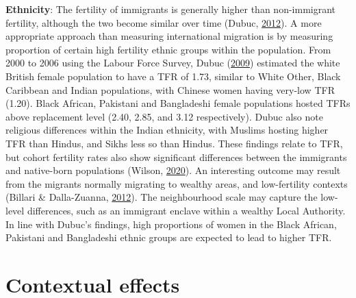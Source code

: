 \documentclass[12pt,twoside]{reedthesis}
\begin{document}
\textbf{Ethnicity}: The fertility of immigrants is generally higher than non-immigrant fertility, although the two become similar over time (Dubuc, \protect\hyperlink{ref-dubuc2012}{2012}). A more appropriate approach than measuring international migration is by measuring proportion of certain high fertility ethnic groups within the population. From 2000 to 2006 using the Labour Force Survey, Dubuc (\protect\hyperlink{ref-dubuc2009}{2009}) estimated the white British female population to have a TFR of 1.73, similar to White Other, Black Caribbean and Indian populations, with Chinese women having very-low TFR (1.20). Black African, Pakistani and Bangladeshi female populations hosted TFRs above replacement level (2.40, 2.85, and 3.12 respectively). Dubuc also note religious differences within the Indian ethnicity, with Muslims hosting higher TFR than Hindus, and Sikhs less so than Hindus. These findings relate to TFR, but cohort fertility rates also show significant differences between the immigrants and native-born populations (Wilson, \protect\hyperlink{ref-wilson2020}{2020}). An interesting outcome may result from the migrants normally migrating to wealthy areas, and low-fertility contexts (Billari \& Dalla-Zuanna, \protect\hyperlink{ref-billari2012}{2012}). The neighbourhood scale may capture the low-level differences, such as an immigrant enclave within a wealthy Local Authority. In line with Dubuc's findings, high proportions of women in the Black African, Pakistani and Bangladeshi ethnic groups are expected to lead to higher TFR.

\hypertarget{contextual-effects}{%
\section{Contextual effects}\label{contextual-effects}}
\end{document}
